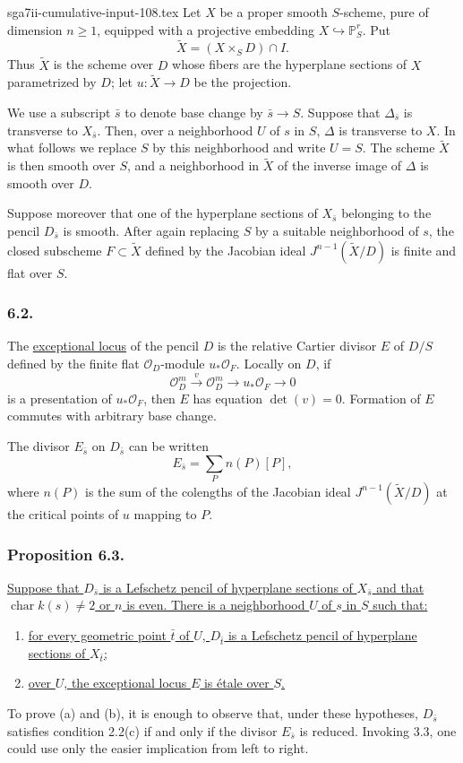 \begin{filecontents*}{sga7ii-cumulative-input-108.tex}
Let $X$ be a proper smooth $S$-scheme, pure of dimension $n\geq1$,
equipped with a projective embedding $X\hookrightarrow\mathbb P^r_S$.
Put
\[
\widetilde X=(X\times_SD)\cap I.
\]
Thus $\widetilde X$ is the scheme over $D$ whose fibers are the
hyperplane sections of $X$ parametrized by $D$; let
$u:\widetilde X\to D$ be the projection.

We use a subscript $\bar s$ to denote base change by
$\bar s\to S$.  Suppose that $\Delta_{\bar s}$ is transverse to
$X_{\bar s}$.  Then, over a neighborhood $U$ of $s$ in $S$,
$\Delta$ is transverse to $X$.  In what follows we replace $S$ by
this neighborhood and write $U=S$.  The scheme $\widetilde X$ is then
smooth over $S$, and a neighborhood in $\widetilde X$ of the inverse
image of $\Delta$ is smooth over $D$.

Suppose moreover that one of the hyperplane sections of $X_{\bar s}$
belonging to the pencil $D_{\bar s}$ is smooth.  After again replacing
$S$ by a suitable neighborhood of $s$, the closed subscheme
$F\subset\widetilde X$ defined by the Jacobian ideal
$J^{n-1}(\widetilde X/D)$ is finite and flat over $S$.

\subsubsection*{6.2.}
The \underline{exceptional locus} of the pencil $D$ is the relative
Cartier divisor $E$ of $D/S$ defined by the finite flat
$\mathcal O_D$-module $u_*\mathcal O_F$.  Locally on $D$, if
\[
\mathcal O_D^m\xrightarrow{\ v\ }\mathcal O_D^m
\longrightarrow u_*\mathcal O_F\longrightarrow0
\]
is a presentation of $u_*\mathcal O_F$, then $E$ has equation
$\det(v)=0$.  Formation of $E$ commutes with arbitrary base change.

The divisor $E_{\bar s}$ on $D_{\bar s}$ can be written
\[
E_{\bar s}=\sum_P n(P)[P],
\]
where $n(P)$ is the sum of the colengths of the Jacobian ideal
$J^{n-1}(\widetilde X/D)$ at the critical points of $u$ mapping to
$P$.

\subsubsection*{Proposition 6.3.}
\underline{Suppose that $D_{\bar s}$ is a Lefschetz pencil of
hyperplane sections of $X_{\bar s}$ and that
$\operatorname{char}k(s)\ne2$ or $n$ is even.  There is a
neighborhood $U$ of $s$ in $S$ such that:}
\begin{enumerate}
\item[(a)] \underline{for every geometric point $\bar t$ of $U$,
$D_{\bar t}$ is a Lefschetz pencil of hyperplane sections of
$X_{\bar t}$;}
\item[(b)] \underline{over $U$, the exceptional locus $E$ is étale
over $S$.}
\end{enumerate}
To prove (a) and (b), it is enough to observe that, under these
hypotheses, $D_{\bar s}$ satisfies condition 2.2(c) if and only if
the divisor $E_{\bar s}$ is reduced.  Invoking 3.3, one could use
only the easier implication from left to right.


\end{filecontents*}
